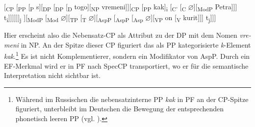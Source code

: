 \documentclass[output=paper, colorlinks, citecolor=brown, booklanguage=german]{langscibook}
\begin{document}
\begin{otherlanguage}{german}
\ea \label{ex:18:32} [\textsubscript{CP} [\textsubscript{PP} [\textsubscript{P} s][\textsubscript{DP} [\textsubscript{DP} [\textsubscript{D} togo][\textsubscript{NP} vremeni]][\textsubscript{CP} [\textsubscript{PP} kak]\textsubscript{i} [\textsubscript{C'} [\textsubscript{C} $\varnothing$][\textsubscript{ModP}
\newline
[\textsubscript{Mod} $\varnothing$][\textsubscript{TP} [\textsubscript{T} $\varnothing$][\textsubscript{AspP} [\textsubscript{AspP} [\textsubscript{Asp} $\varnothing$][\textsubscript{VP} ja [\textsubscript{V'} [\textsubscript{V} znaju] Petra]]] t\textsubscript{i}]]]]]]\textsubscript{j} 
\newline
[[\textsubscript{C'} [\textsubscript{C} $\varnothing$]][\textsubscript{ModP} [\textsubscript{Mod} $\varnothing$][\textsubscript{TP} [\textsubscript{T} $\varnothing$][\textsubscript{AspP} [\textsubscript{AspP} [\textsubscript{Asp} $\varnothing$][\textsubscript{VP} on [\textsubscript{V} kurit]]] t\textsubscript{j}]]]
\z

\noindent Hier erscheint also die Nebensatz-CP als Attribut zu der DP mit dem Nomen \textit{vremeni} in NP. An der Spitze dieser CP figuriert das als PP kategorisierte \textit{k}-Element \textit{kak}.\footnote{\label{fn:18:8}Während im Russischen die nebensatzinterne PP \textit{kak} in PF an der CP-Spitze figuriert, unterbleibt im Deutschen die Bewegung der entsprechenden phonetisch leeren PP (vgl. ).} Es ist nicht Komplementierer, sondern ein Modifikator von AspP. Durch ein EF-Merkmal wird er in PF nach SpecCP transportiert, wo er für die semantische Interpretation nicht sichtbar ist.

\ea \label{ex:18:33}
	\z
\z

\ea \label{ex:18:34}
	\z
\z


\end{otherlanguage}
\end{document}
